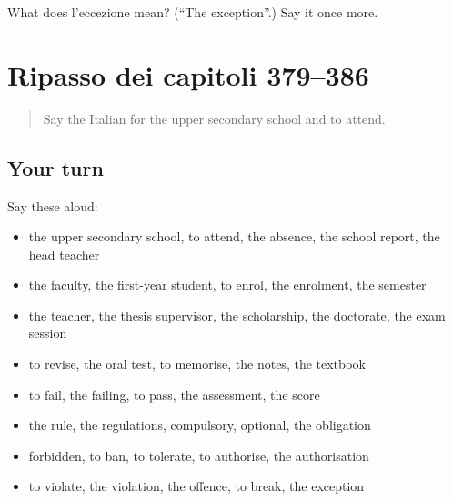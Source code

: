 \begin{tcolorbox}[breakable,colback=teal!4,colframe=teal!35!black,title={Before you move on}]
What does l'eccezione mean? (\textquotedblleft{}The exception\textquotedblright{}.) Say it once more.
\end{tcolorbox}
\section[(dialogue)]{Ripasso dei capitoli 379–386}

\label{lesson:IT-R386-ripasso-379-386}



\begin{quote}
Say the Italian for the upper secondary school and to attend.
\end{quote}

\subsection*{Your turn}
Say these aloud:

\begin{itemize}
\raggedright
  \item the upper secondary school, to attend, the absence, the school report, the head teacher
  \item the faculty, the first-year student, to enrol, the enrolment, the semester
  \item the teacher, the thesis supervisor, the scholarship, the doctorate, the exam session
  \item to revise, the oral test, to memorise, the notes, the textbook
  \item to fail, the failing, to pass, the assessment, the score
  \item the rule, the regulations, compulsory, optional, the obligation
  \item forbidden, to ban, to tolerate, to authorise, the authorisation
  \item to violate, the violation, the offence, to break, the exception
\end{itemize}


